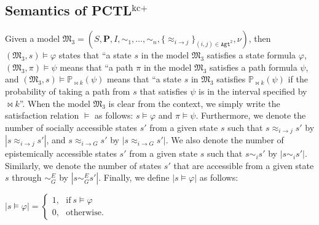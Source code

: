 \subsection{Semantics of PCTL$^{\textrm{kc+}}$} \label{def:semantics-PCTLKC+}

Given a model $\mathfrak{M_3}=(S,\textbf{P},I,\sim_1, \ldots
,\sim_n,\{\approx_{i \to j}\}_{{(i,j)}\in \texttt{Agt}^2},\nu)$, then $(\mathfrak{M_3},s) \models \varphi$ states that ``a state $s$ in the model $\mathfrak{M_3}$ satisfies a state formula $\varphi$, $(\mathfrak{M_3},\pi) \models \psi$ means that ``a path $\pi$ in the model $\mathfrak{M_3}$ satisfies a path formula $\psi$, and
$(\mathfrak{M_3},s) \models \mathbb{P}_{\bowtie k}(\psi)$ means that
``a state $s$ in $\mathfrak{M_3}$ satisfies
$\mathbb{P}_{\bowtie k}(\psi)$ if the probability of taking a path
from $s$ that satisfies $\psi$ is in the interval specified by
$\bowtie k$''. When the model $\mathfrak{M_3}$ is clear from the
context, we simply write the satisfaction relation $\models$ as
follows: $s \models \varphi$ and $\pi \models \psi$. Furthermore,
we denote the number of socially accessible states $s'$ from a given state $s$ such that $s\approx_{i\to j}s'$ by $|s\approx_{i\to j}s'|$, and $s\approx_{i\to G}s'$ by $|s\approx_{i\to G}s'|$.
We also denote the number of epistemically accessible states $s'$ from a given state $s$ such that $s\sim_i s'$ by $|s\sim_i s'|$. Similarly, we
denote the number of states $s'$ that are accessible from a given
state $s$ through $\sim_G^E$ by $|s\sim_G^E s'|$.
Finally, we define $|s\models \varphi|$ as follows:

\begin{center}
$|s\models \varphi|=
\begin{cases}
1,~~~\textrm{if}~ s\models\varphi\\
0,~~~\textrm{otherwise}.
\end{cases}$
\end{center}


